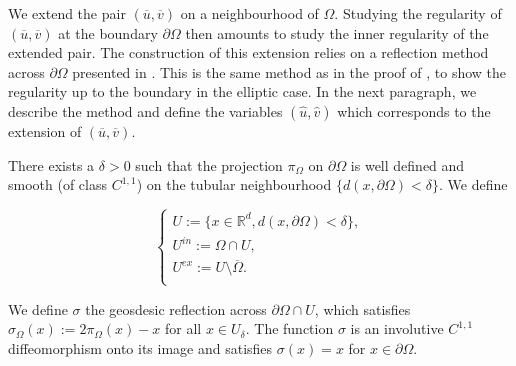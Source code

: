 \documentclass[reqno,12pt,twoside]{amsart}
\numberwithin{equation}{section} \numberwithin{theorem}{section}
\numberwithin{proposition}{section} \numberwithin{lemma}{section}
\numberwithin{corollary}{section}
\numberwithin{definition}{section} \numberwithin{remark}{section}
\begin{document}
We extend the pair $(\overline{u}, \overline{v})$ on a neighbourhood of $\Omega$. Studying the regularity of $(\overline{u}, \overline{v})$ at the boundary $\partial\Omega$ then amounts to study the inner regularity of the extended pair. The construction of this extension relies on a reflection method across $\partial \Omega$ presented in \cite{S06}. This is the same method as in the proof of \cite[Theorem 3.2]{BMRa23}, to show the regularity up to the boundary in the elliptic case. In the next paragraph, we describe the method and define the variables $(\hat{u}, \hat{v})$ which corresponds to the extension of $(\overline{u},\overline{v})$. 

\smallskip

There exists a $\delta >0$ such that the projection $\pi_\Omega$ on $\partial \Omega$ is well defined and smooth (of class $C^{1,1}$) on the tubular neighbourhood $\{d(x,\partial\Omega) < \delta\}$.
We define 

\[\left\{\begin{array}{l}
U := \{x\in \mathbb{R}^d, d(x,\partial \Omega) < \delta \},\\
U^{in} := \Omega \cap U,\\
U^{ex} := U \setminus \overline{\Omega}.\\
\end{array}\right.\]  

We define $\sigma$ the geosdesic reflection across $\partial \Omega \cap U$, which satisfies $\sigma_\Omega (x) := 2 \pi_\Omega (x) - x$ for all $x\in U_\delta$. 
The function $\sigma$ is an involutive $C^{1,1}$ diffeomorphism onto its image and satisfies $\sigma(x) = x$ for $x\in \partial \Omega$. 


\end{document}
